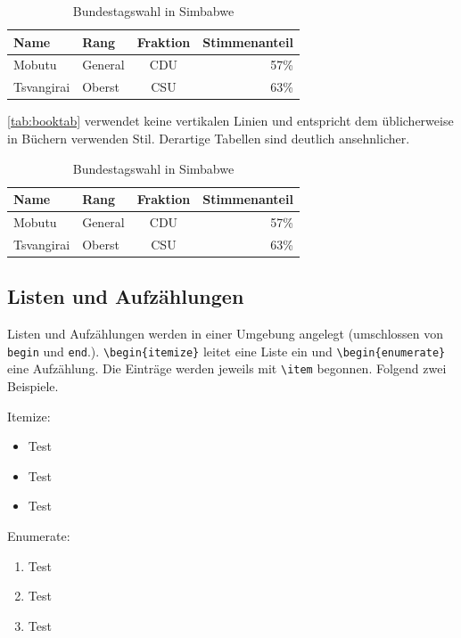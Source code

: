 \begin{table}[h]
\centering
\begin{tabular} {|llc||r|}
	\hline
	Name & Rang & Fraktion & Stimmenanteil \\
	\hline
	Mobutu & General & CDU & 57\% \\
	Tsvangirai & Oberst & CSU & 63\% \\
	\hline
\end{tabular}
\caption {Bundestagswahl in Simbabwe}
\label{tab:tabular}
\end{table}

\autoref{tab:booktab} verwendet keine vertikalen Linien und entspricht dem üblicherweise in Büchern verwenden Stil. Derartige Tabellen sind deutlich ansehnlicher.

\begin{table}[h]
\centering
\begin{tabular} {llcr}
	\toprule
	Name & Rang & Fraktion & Stimmenanteil \\
	\midrule
	Mobutu & General & CDU & 57\% \\
	Tsvangirai & Oberst & CSU & 63\% \\
	\bottomrule
\end{tabular}
\caption {Bundestagswahl in Simbabwe}
\label{tab:booktab}
\end{table}

\subsection{Listen und Aufzählungen}

Listen und Aufzählungen werden in einer Umgebung angelegt (umschlossen von \verb|begin| und \verb|end|.). \verb|\begin{itemize}| leitet eine Liste ein und \verb|\begin{enumerate}| eine Aufzählung. Die Einträge werden jeweils mit \verb|\item| begonnen. Folgend zwei Beispiele.

Itemize:
\begin{itemize}
\item Test
\item Test
\item Test
\end{itemize}

Enumerate:
\begin{enumerate}
\item Test
\item Test
\item Test
\end{enumerate}

